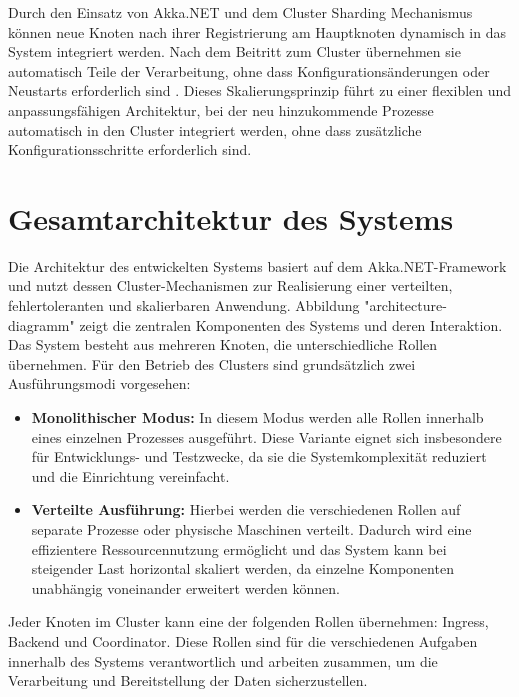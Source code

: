 Durch den Einsatz von Akka.NET und dem Cluster Sharding Mechanismus 
können neue Knoten nach ihrer Registrierung am Hauptknoten dynamisch in das System integriert werden. 
Nach dem Beitritt zum Cluster übernehmen sie automatisch Teile der Verarbeitung, 
ohne dass Konfigurationsänderungen oder Neustarts erforderlich sind \parencite{akkaNet}.
Dieses Skalierungsprinzip führt zu einer flexiblen und anpassungsfähigen Architektur,
bei der neu hinzukommende Prozesse automatisch in den Cluster integriert werden,
ohne dass zusätzliche Konfigurationsschritte erforderlich sind.

\section{Gesamtarchitektur des Systems}
Die Architektur des entwickelten Systems basiert auf dem Akka.NET-Framework und nutzt dessen Cluster-Mechanismen zur Realisierung einer verteilten, fehlertoleranten und skalierbaren Anwendung.
Abbildung "architecture-diagramm" zeigt die zentralen Komponenten des Systems und deren Interaktion.
Das System besteht aus mehreren Knoten, die unterschiedliche Rollen übernehmen. Für den Betrieb des Clusters sind grundsätzlich zwei Ausführungsmodi vorgesehen:
\begin{itemize}
    \item \textbf{Monolithischer Modus:} 
    In diesem Modus werden alle Rollen innerhalb eines einzelnen Prozesses ausgeführt.
    Diese Variante eignet sich insbesondere für Entwicklungs- und Testzwecke, da sie die Systemkomplexität 
    reduziert und die Einrichtung vereinfacht.
    \item \textbf{Verteilte Ausführung:} 
    Hierbei werden die verschiedenen Rollen auf separate Prozesse oder physische Maschinen verteilt.  
    Dadurch wird eine effizientere Ressourcennutzung ermöglicht und das System kann bei steigender Last 
    horizontal skaliert werden, da einzelne Komponenten unabhängig voneinander erweitert werden können.
\end{itemize}

Jeder Knoten im Cluster kann eine der folgenden Rollen übernehmen: Ingress, Backend und Coordinator.
Diese Rollen sind für die verschiedenen Aufgaben innerhalb des Systems verantwortlich und arbeiten zusammen, um die Verarbeitung und Bereitstellung der Daten sicherzustellen.

